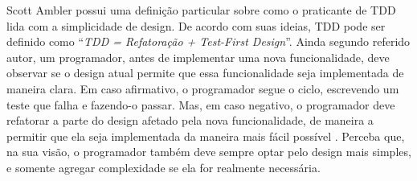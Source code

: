 Scott Ambler possui uma definição particular sobre como o praticante de TDD lida
com a simplicidade de design. De acordo com suas ideias, TDD pode ser definido como
``\textit{TDD = Refatoração + Test-First Design}''. Ainda segundo referido autor, um programador,
antes de implementar uma nova funcionalidade, deve observar se o design atual
permite que essa funcionalidade seja implementada de maneira clara. Em caso
afirmativo, o programador segue o ciclo, escrevendo um teste que falha e
fazendo-o passar. Mas, em caso negativo, o programador deve refatorar a parte do
design afetado pela nova funcionalidade, de maneira a permitir que ela seja
implementada da maneira mais fácil possível \cite{wambler-tdd}. Perceba que, na
sua visão, o programador também deve sempre optar pelo design mais simples, e
somente agregar complexidade se ela for realmente necessária.


